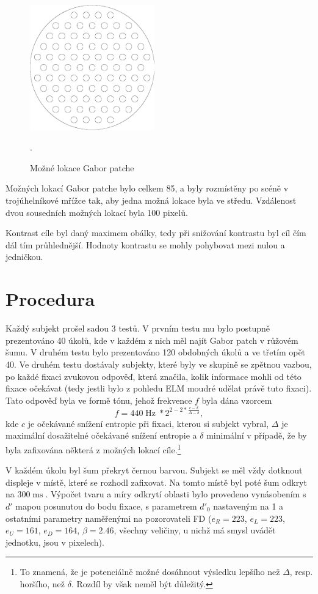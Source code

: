 \begin{figure}
\centering
\includegraphics[width=0.48\textwidth]{img/locations_outline.png}
\caption {Možné lokace Gabor patche}.
\end{figure}

Možných lokací Gabor patche bylo celkem 85, a byly rozmístěny po scéně v
trojúhelníkové mřížce tak, aby jedna možná lokace byla ve středu. Vzdálenost
dvou sousedních možných lokací byla 100 pixelů. 

Kontrast cíle byl daný maximem obálky, tedy při snižování kontrastu byl cíl čím dál tím průhlednější. Hodnoty kontrastu se mohly pohybovat mezi nulou a jedničkou.

\section{Procedura}

Každý subjekt prošel sadou 3
testů. V prvním testu mu bylo postupně prezentováno 40 úkolů, kde
v každém z nich měl najít Gabor patch v růžovém šumu.  
V druhém testu bylo prezentováno 120 obdobných úkolů a ve třetím opět 40. Ve druhém testu dostávaly
subjekty, které byly ve skupině se zpětnou vazbou, po každé fixaci zvukovou
odpověď, která značila, kolik informace mohli od této fixace očekávat (tedy
jestli bylo z pohledu ELM moudré udělat právě tuto fixaci). Tato odpověď
byla ve formě tónu, jehož frekvence $f$ byla dána vzorcem
$$f = 440\operatorname{Hz}*2^{2-2*\frac{c - \delta}{\Delta - \delta}},$$ kde $c$ je očekávané snížení entropie při fixaci, kterou si subjekt vybral, $\Delta$ je maximální dosažitelné očekávané
snížení entropie a $\delta$ minimální v případě, že by byla zafixována některá
z možných lokací cíle.\footnote{To znamená, že je potenciálně možné dosáhnout
výsledku lepšího než $\Delta$, resp. horšího, než $\delta$. Rozdíl by však
neměl být důležitý.} 

V každém úkolu byl šum překryt černou barvou. Subjekt se měl vždy dotknout displeje v místě, které se
rozhodl zafixovat. Na tomto místě byl poté šum odkryt na $300
\operatorname{ms}$. Výpočet tvaru a míry odkrytí oblasti bylo provedeno
vynásobením s $d'$ mapou posunutou do bodu fixace, s parametrem $d'_0$
nastaveným na 1 a ostatními parametry naměřenými na pozorovateli FD
($e_R=223$, $e_L=223$, $e_U = 161$, $e_D = 164$, $\beta=2.46$, všechny
veličiny, u nichž má smysl uvádět jednotku, jsou v pixelech).

